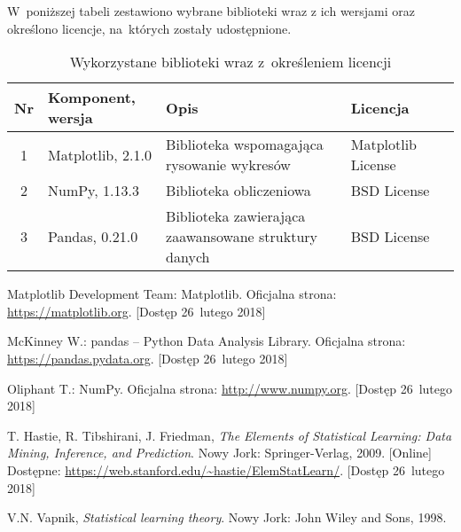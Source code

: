 \documentclass[12pt,a4paper]{article}
\begin{document}
\noindent
W~poniższej tabeli zestawiono wybrane biblioteki wraz z ich wersjami oraz określono licencje, na~których zostały udostępnione.
\begin{table}[H]
    \begin{tabularx}{\textwidth}{|c|l|X|l|c|}
        \hline
        \textbf{Nr} & \textbf{Komponent, wersja} & \textbf{Opis} & \textbf{Licencja} & \\
        \hline
        \hline
        1 & 
        Matplotlib, 2.1.0 & 
        Biblioteka wspomagająca rysowanie wykresów &
        Matplotlib License &
        \cite{matplotlib} \\
        \hline
        2 & 
        NumPy, 1.13.3 &
        Biblioteka obliczeniowa &
        BSD License &
        \cite{numpy} \\
        \hline
        3 &
        Pandas, 0.21.0 &
        Biblioteka zawierająca zaawansowane struktury danych &
        BSD License &
        \cite{pandas} \\
        \hline
    \end{tabularx}
    \caption{Wykorzystane biblioteki wraz z~określeniem licencji}
\end{table}

\begin{thebibliography}{9}

        Matplotlib Development Team:
        Matplotlib.
        Oficjalna strona: \url{https://matplotlib.org}.
        [Dostęp 26~lutego 2018]

        McKinney W.:
        pandas -- Python Data Analysis Library.
        Oficjalna strona: \url{https://pandas.pydata.org}.
        [Dostęp 26~lutego 2018]

        Oliphant T.:
        NumPy.
        Oficjalna strona: \url{http://www.numpy.org}.
        [Dostęp 26~lutego 2018]

        T. Hastie,
        R. Tibshirani,
        J. Friedman,
        \emph{The Elements of Statistical Learning: Data Mining, Inference, and Prediction}.
        Nowy Jork: Springer-Verlag,
        2009.
        [Online] \\
        Dostępne: \url{https://web.stanford.edu/~hastie/ElemStatLearn/}.
        [Dostęp 26~lutego 2018]

        V.N. Vapnik,
        \emph{Statistical learning theory}.
        Nowy Jork: John Wiley and Sons,
        1998.

\end{thebibliography}
\end{document}
